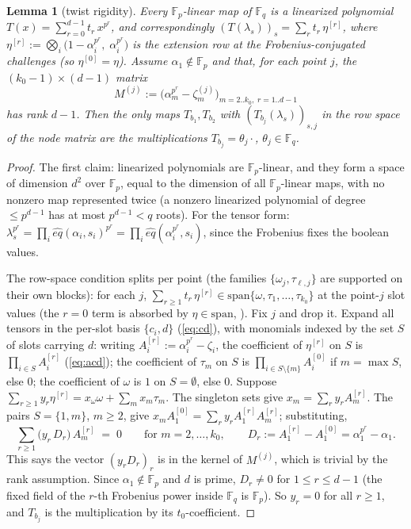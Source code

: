 \documentclass{article}
\newcommand{\Fp}{\mathbb{F}_p}
\newcommand{\Fq}{\mathbb{F}_q}
\newcommand{\extdeg}{d}
\newtheorem{lemma}{Lemma}
\theoremstyle{definition}
\begin{document}
\begin{lemma}[twist rigidity]\label{cond:twist}
Every $\Fp$-linear map of $\Fq$ is a linearized polynomial $T(x) = \sum_{r=0}^{\extdeg-1} t_r\, x^{p^r}$, and correspondingly $(T(\lambda_s))_s = \sum_r t_r\, \eta^{[r]}$, where $\eta^{[r]} := \bigotimes_i \big(1 - \alpha_i^{p^r},\; \alpha_i^{p^r}\big)$ is the extension row at the Frobenius-conjugated challenges (so $\eta^{[0]} = \eta$). Assume $\alpha_1 \notin \Fp$ and that, for each point $j$, the $(k_0 - 1) \times (\extdeg - 1)$ matrix
\[
M^{(j)} := \Big( \alpha_m^{p^r} - \zeta^{(j)}_m \Big)_{m = 2..k_0,\; r = 1..\extdeg - 1}
\]
has rank $\extdeg - 1$. Then the only maps $T_{b_1}, T_{b_2}$ with $(T_{b_j}(\lambda_s))_{s,j}$ in the row space of the node matrix are the multiplications $T_{b_j} = \theta_j \cdot$, $\theta_j \in \Fq$.
\end{lemma}

\begin{proof}
The first claim: linearized polynomials are $\Fp$-linear, and they form a space of dimension $\extdeg^2$ over $\Fp$, equal to the dimension of all $\Fp$-linear maps, with no nonzero map represented twice (a nonzero linearized polynomial of degree $\leq p^{\extdeg - 1}$ has at most $p^{\extdeg-1} < q$ roots). For the tensor form: $\lambda_s^{p^r} = \prod_i \hat{eq}(\alpha_i, s_i)^{p^r} = \prod_i \hat{eq}(\alpha_i^{p^r}, s_i)$, since the Frobenius fixes the boolean values.

The row-space condition splits per point (the families $\{\omega_j, \tau_{\ell,j}\}$ are supported on their own blocks): for each $j$, $\sum_{r \geq 1} t_r\, \eta^{[r]} \in \mathrm{span}\{\omega, \tau_1, \dots, \tau_{k_0}\}$ at the point-$j$ slot values (the $r = 0$ term is absorbed by $\eta \in \mathrm{span}$, ). Fix $j$ and drop it. Expand all tensors in the per-slot basis $\{c_i, d\}$ (\cref{eq:cd}), with monomials indexed by the set $S$ of slots carrying $d$: writing $A^{[r]}_i := \alpha_i^{p^r} - \zeta_i$, the coefficient of $\eta^{[r]}$ on $S$ is $\prod_{i \in S} A^{[r]}_i$ (\cref{eq:acd}); the coefficient of $\tau_m$ on $S$ is $\prod_{i \in S \setminus \{m\}} A^{[0]}_i$ if $m = \max S$, else $0$; the coefficient of $\omega$ is $1$ on $S = \emptyset$, else $0$. Suppose $\sum_{r \geq 1} y_r \eta^{[r]} = x_\omega \omega + \sum_m x_m \tau_m$. The singleton sets give $x_m = \sum_r y_r A^{[r]}_m$. The pairs $S = \{1, m\}$, $m \geq 2$, give $x_m A^{[0]}_1 = \sum_r y_r A^{[r]}_1 A^{[r]}_m$; substituting,
\[
\sum_{r \geq 1} \big( y_r\, D_r \big)\, A^{[r]}_m \;=\; 0 \qquad \text{for } m = 2, \dots, k_0 , \qquad D_r := A^{[r]}_1 - A^{[0]}_1 = \alpha_1^{p^r} - \alpha_1 .
\]
This says the vector $(y_r D_r)_r$ is in the kernel of $M^{(j)}$, which is trivial by the rank assumption. Since $\alpha_1 \notin \Fp$ and $\extdeg$ is prime, $D_r \neq 0$ for $1 \leq r \leq \extdeg - 1$ (the fixed field of the $r$-th Frobenius power inside $\Fq$ is $\Fp$). So $y_r = 0$ for all $r \geq 1$, and $T_{b_j}$ is the multiplication by its $t_0$-coefficient.
\end{proof}
\end{document}
